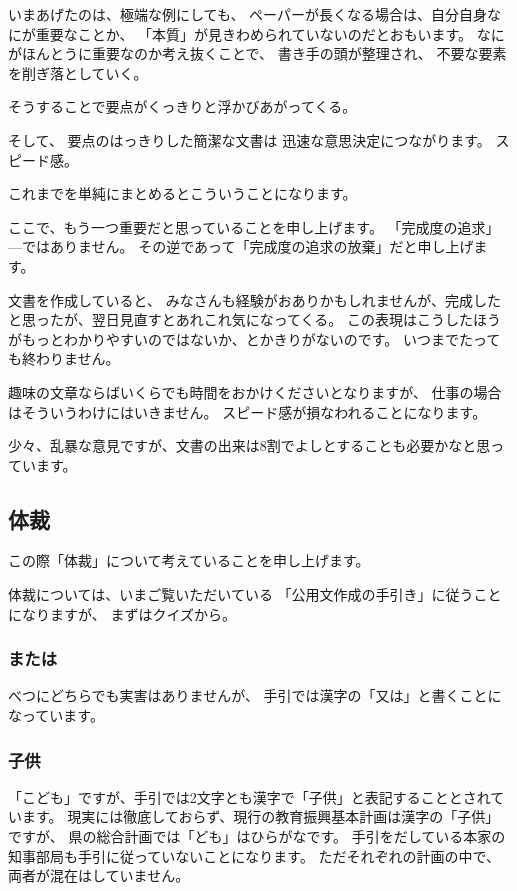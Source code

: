 \documentclass[uplatex,jis2004,dvipdfmx,12pt]{jsarticle}
\begin{document}
いまあげたのは、極端な例にしても、
ペーパーが長くなる場合は、自分自身なにが重要なことか、
「本質」が見きわめられていないのだとおもいます。
なにがほんとうに重要なのか考え抜くことで、
書き手の頭が整理され、
不要な要素を削ぎ落としていく。

そうすることで要点がくっきりと浮かびあがってくる。

そして、
要点のはっきりした簡潔な文書は
迅速な意思決定につながります。
スピード感。

これまでを単純にまとめるとこういうことになります。

ここで、もう一つ重要だと思っていることを申し上げます。
「完成度の追求」---ではありません。
その逆であって「完成度の追求の放棄」だと申し上げます。

文書を作成していると、
みなさんも経験がおありかもしれませんが、完成したと思ったが、翌日見直すとあれこれ気になってくる。
この表現はこうしたほうがもっとわかりやすいのではないか、とかきりがないのです。
いつまでたっても終わりません。

趣味の文章ならばいくらでも時間をおかけくださいとなりますが、
仕事の場合はそういうわけにはいきません。
スピード感が損なわれることになります。

少々、乱暴な意見ですが、文書の出来は8割でよしとすることも必要かなと思っています。







\subsection{体裁}

この際「体裁」について考えていることを申し上げます。


体裁については、いまご覧いただいている
「公用文作成の手引き」に従うことになりますが、
まずはクイズから。

\subsubsection{または}
べつにどちらでも実害はありませんが、
手引では漢字の「又は」と書くことになっています。


\subsubsection{子供}
「こども」ですが、手引では2文字とも漢字で「子供」と表記することとされています。
現実には徹底しておらず、現行の教育振興基本計画は漢字の「子供」ですが、
県の総合計画では「ども」はひらがなです。
手引をだしている本家の知事部局も手引に従っていないことになります。
ただそれぞれの計画の中で、
両者が混在はしていません。
\end{document}
